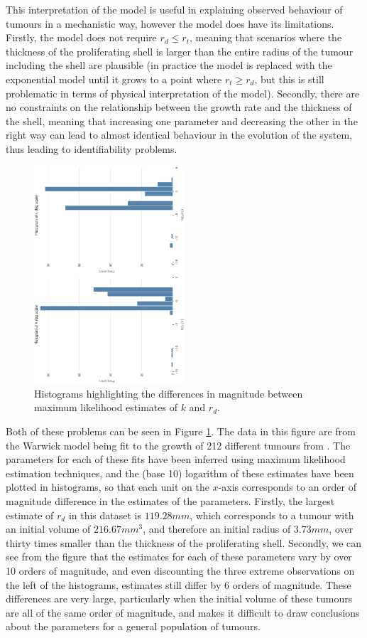 \documentclass[11pt,a4paper]{article}
\begin{document}
This interpretation of the model is useful in explaining observed behaviour of tumours in a mechanistic way, however the model does have its limitations. Firstly, the model does not require $r_d \leq r_t$, meaning that scenarios where the thickness of the proliferating shell is larger than the entire radius of the tumour including the shell are plausible (in practice the model is replaced with the exponential model until it grows to a point where $r_t \geq r_d$, but this is still problematic in terms of physical interpretation of the model). Secondly, there are no constraints on the relationship between the growth rate and the thickness of the shell, meaning that increasing one parameter and decreasing the other in the right way can lead to almost identical behaviour in the evolution of the system, thus leading to identifiability problems.
\begin{figure}
\centering
\includegraphics[width=0.5\textwidth, angle = 270]{k_rd_histograms.eps}
\caption{Histograms highlighting the differences in magnitude between maximum likelihood estimates of $k$ and $r_d$.}
\label{fig:hist}
\end{figure}
Both of these problems can be seen in Figure \ref{fig:hist}. The data in this figure are from the Warwick model being fit to the growth of 212 different tumours from \cite{Gao15}. The parameters for each of these fits have been inferred using maximum likelihood estimation techniques, and the (base 10) logarithm of these estimates have been plotted in histograms, so that each unit on the $x$-axis corresponds to an order of magnitude difference in the estimates of the parameters. Firstly, the largest estimate of $r_d$ in this dataset is $119.28mm$, which corresponds to a tumour with an initial volume of $216.67mm^3$, and therefore an initial radius of $3.73mm$, over thirty times smaller than the thickness of the proliferating shell. Secondly, we can see from the figure that the estimates for each of these parameters vary by over 10 orders of magnitude, and even discounting the three extreme observations on the left of the histograms, estimates still differ by 6 orders of magnitude. These differences are very large, particularly when the initial volume of these tumours are all of the same order of magnitude, and makes it difficult to draw conclusions about the parameters for a general population of tumours.
\end{document}
